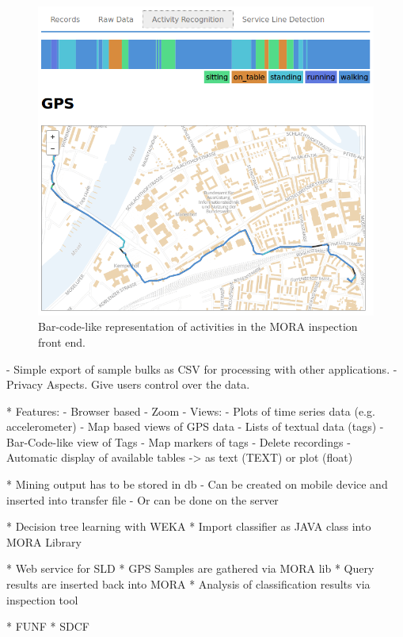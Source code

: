 \documentclass[times, 10pt,twocolumn]{article}
\begin{document}
\begin{figure}[h]
\includegraphics[width=\linewidth]{img/BarcodeScreenshot.png}
\caption{Bar-code-like representation of activities in the MORA inspection front end.}
\label{fig:inspection}
\end{figure}

  - Simple export of sample bulks as CSV for processing with other applications.
  - Privacy Aspects. Give users control over the data.

* Features:
  - Browser based
  - Zoom
  - Views:
    - Plots of time series data (e.g. accelerometer)
    - Map based views of GPS data
    - Lists of textual data (tags)
    - Bar-Code-like view of Tags
    - Map markers of tags
  - Delete recordings
  - Automatic display of available tables
    -> as text (TEXT) or plot (float)

* Mining output has to be stored in db
  - Can be created on mobile device and inserted into transfer file
  - Or can be done on the server


* Decision tree learning with WEKA
* Import classifier as JAVA class into MORA Library

* Web service for SLD
* GPS Samples are gathered via MORA lib
* Query results are inserted back into MORA
* Analysis of classification results via inspection tool


* FUNF
* SDCF


\nocite{ex1,ex2}


\end{document}
